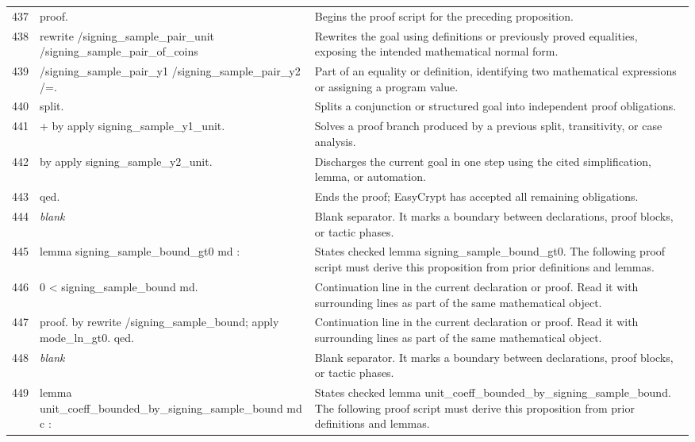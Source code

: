 \documentclass[10pt]{article}
\begin{document}
\begin{longtable}{r L{0.53\textwidth} L{0.37\textwidth}}
437 & {\ttfamily\scriptsize proof.} & Begins the proof script for the preceding proposition. \\
438 & {\ttfamily\scriptsize rewrite /signing\_sample\_pair\_unit /signing\_sample\_pair\_of\_coins} & Rewrites the goal using definitions or previously proved equalities, exposing the intended mathematical normal form. \\
439 & {\ttfamily\scriptsize         /signing\_sample\_pair\_y1 /signing\_sample\_pair\_y2 /=.} & Part of an equality or definition, identifying two mathematical expressions or assigning a program value. \\
440 & {\ttfamily\scriptsize split.} & Splits a conjunction or structured goal into independent proof obligations. \\
441 & {\ttfamily\scriptsize + by apply signing\_sample\_y1\_unit.} & Solves a proof branch produced by a previous split, transitivity, or case analysis. \\
442 & {\ttfamily\scriptsize by apply signing\_sample\_y2\_unit.} & Discharges the current goal in one step using the cited simplification, lemma, or automation. \\
443 & {\ttfamily\scriptsize qed.} & Ends the proof; EasyCrypt has accepted all remaining obligations. \\
444 & {\ttfamily\scriptsize \emph{blank}} & Blank separator.  It marks a boundary between declarations, proof blocks, or tactic phases. \\
445 & {\ttfamily\scriptsize lemma signing\_sample\_bound\_gt0 md :} & States checked lemma signing\_sample\_bound\_gt0.  The following proof script must derive this proposition from prior definitions and lemmas. \\
446 & {\ttfamily\scriptsize   0 < signing\_sample\_bound md.} & Continuation line in the current declaration or proof.  Read it with surrounding lines as part of the same mathematical object. \\
447 & {\ttfamily\scriptsize proof. by rewrite /signing\_sample\_bound; apply mode\_ln\_gt0. qed.} & Continuation line in the current declaration or proof.  Read it with surrounding lines as part of the same mathematical object. \\
448 & {\ttfamily\scriptsize \emph{blank}} & Blank separator.  It marks a boundary between declarations, proof blocks, or tactic phases. \\
449 & {\ttfamily\scriptsize lemma unit\_coeff\_bounded\_by\_signing\_sample\_bound md c :} & States checked lemma unit\_coeff\_bounded\_by\_signing\_sample\_bound.  The following proof script must derive this proposition from prior definitions and lemmas. \\

\end{longtable}
\end{document}
